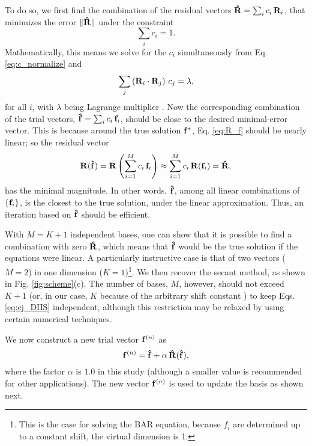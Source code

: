 \documentclass[aip,jcp,preprint,superscriptaddress]{revtex4-1}
\begin{document}
To do so, we first find the combination of the residual vectors
$\mathbf{\hat R} = \sum_i c_i \, \mathbf{R}_i$,
that minimizes the error
$\| \mathbf{\hat R} \|$
under the constraint
\begin{equation}
  \sum_i c_i = 1.
  \label{eq:c_normalize}
\end{equation}
%
Mathematically,
this means  we solve for the $c_i$ simultaneously
from Eq. \eqref{eq:c_normalize} and
%
\begin{equation}
  \sum_j \left( \mathbf{R}_i \cdot \mathbf{R}_j \right) \, c_j = \lambda,
  \label{eq:cj_DIIS}
\end{equation}
%
for all $i$,
with $\lambda$ being  Lagrange multiplier
.
%
Now the corresponding combination
of the trial vectors,
$\mathbf{\hat f} = \sum_i c_i \, \mathbf{f}_i$,
should be close to the desired minimal-error vector.
%
This is because
around the true solution $\mathbf{f}^*$,
Eq. \eqref{eq:R_f} should be nearly linear;
so the residual vector
%
\[
\mathbf{R}(\mathbf{\hat f})
=
\mathbf{R}\left(
  \sum_{i=1}^M c_i \, \mathbf{f}_i
\right)
\approx
\sum_{i=1}^M c_i \, \mathbf{R}(\mathbf{f}_i)
=\mathbf{\hat R},
\]
%
has the minimal magnitude.
%
In other words,
$\mathbf{\hat f}$,
among all linear combinations of $\{ \mathbf{f}_i \}$,
is the closest to the true solution,
under the linear approximation.
%
Thus,
an iteration based on
$\mathbf{\hat f}$
should be efficient.



With $M = K + 1$ independent bases,
one can show that
it is possible to
find a combination with zero $\mathbf{\hat R}$,
which means that
$\mathbf{\hat f}$ would be the true solution
if the equations were linear.
%
A particularly instructive case is that of
two vectors ($M = 2$)
in one dimension ($K = 1$)\footnote{
This is the case for solving the BAR equation,
because $f_i$ are determined up to a constant shift,
the virtual dimension is 1.}.
%
We then recover
the secant method\cite{press},
as shown in Fig. \ref{fig:scheme}(c).
%
The number of bases, $M$, however,
should not exceed $K + 1$
(or, in our case, $K$
because of the arbitrary shift constant )
to keep Eqs. \eqref{eq:cj_DIIS}
independent,
%
although this restriction may be relaxed
by using certain numerical techniques\cite{
press}.




We now construct a new trial vector $\mathbf{f}^{(n)}$ as
%
\begin{equation*}
\mathbf{f}^{(n)}
=
\mathbf{\hat f}
+
\alpha \, \mathbf{\hat R}( \mathbf{\hat f} ),
\end{equation*}
%
where the factor $\alpha$ is $1.0$ in this study
(although a smaller value is recommended
for other applications\cite{kovalenko1999, howard2011}).
%
The new vector $\mathbf{f}^{(n)}$
is used to update the basis as shown next.
\end{document}
